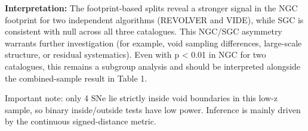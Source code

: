 \documentclass[11pt,a4paper]{article}
\begin{document}
\begin{mdframed}[linecolor=accent,linewidth=0.5pt,backgroundcolor=callout-bg,leftline=true,rightline=true,topline=true,bottomline=true,innerleftmargin=8pt,innerrightmargin=8pt,innertopmargin=6pt,innerbottommargin=6pt]
\textbf{Interpretation:} The footprint-based splits reveal a stronger signal in the NGC footprint for two independent algorithms (REVOLVER and VIDE), while SGC is consistent with null across all three catalogues. This NGC/\allowbreak{}SGC asymmetry warrants further investigation (for example, void sampling differences, large-scale structure, or residual systematics). Even with p < 0.01 in NGC for two catalogues, this remains a subgroup analysis and should be interpreted alongside the combined-sample result in Table 1.
\end{mdframed}

Important note: only 4 SNe lie strictly inside void boundaries in this low-z sample, so binary inside/\allowbreak{}outside tests have low power. Inference is mainly driven by the continuous signed-distance metric.
\end{document}
